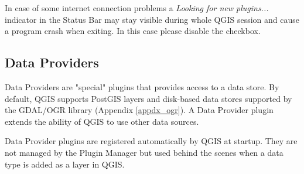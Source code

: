 In case of some internet connection problems a \textit{Looking for new plugins...} indicator in the Status Bar may stay visible during whole QGIS session and cause a program crash when exiting. In this case please disable the checkbox.

\subsection{Data Providers}

Data Providers are "special" plugins that provides access to a data store.
By default, QGIS supports PostGIS layers and disk-based data stores supported by the GDAL/OGR library (Appendix \ref{appdx_ogr}).
A Data Provider plugin extends the ability of QGIS to use other data sources.

Data Provider plugins are registered automatically by QGIS at startup.
They are not managed by the Plugin Manager but used behind the scenes when a data type is added as a layer in QGIS.
